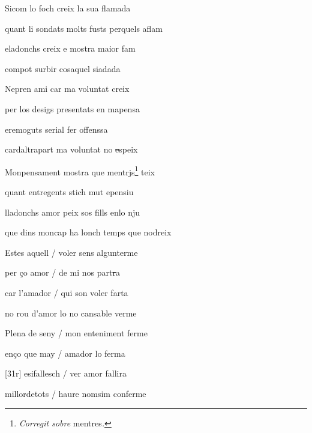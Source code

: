 \documentclass[12pt]{article}
\begin{document}
\begin{estrofa}

 Sicom lo foch creix la sua flamada

 quant li sondats molts fusts perquels aflam

 eladonchs creix e mostra maior fam

 compot surbir cosaquel siadada

 Nepren ami car ma voluntat creix

 per los desigs presentats en mapensa

 eremoguts serial fer offenssa

 cardaltrapart ma voluntat no \sout{e}speix

\end{estrofa}



\begin{estrofa}

 Monpensament mostra que mentrjs\footnote{\textit{Corregit sobre
}mentres\textit{.}} teix

 quant entregents stich mut epensiu

 lladonchs amor peix sos fills enlo nju

 que dins moncap ha lonch temps que nodreix

 Estes aquell / voler sens algunterme

 per \c{c}o amor / de mi  nos part\sout{r}a

 car l'amador / qui son voler  farta

 no rou d'amor lo no cansable verme

\end{estrofa}



\begin{estrofa}

 Plena de seny / mon enteniment ferme

 en\c{c}o que may / amador lo ferma

 [31r] esifallesch / ver amor fallira

 millordetots / haure nomsim conferme

\end{estrofa}
\end{document}
